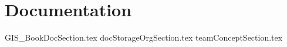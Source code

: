 \documentclass[class=book , crop=false]{standalone} %
\begin{document}
\chapter{Documentation}

{GIS_BookDocSection.tex}
\clearpage %
{docStorageOrgSection.tex}
\clearpage
{teamConceptSection.tex}
\clearpage
\end{document}
